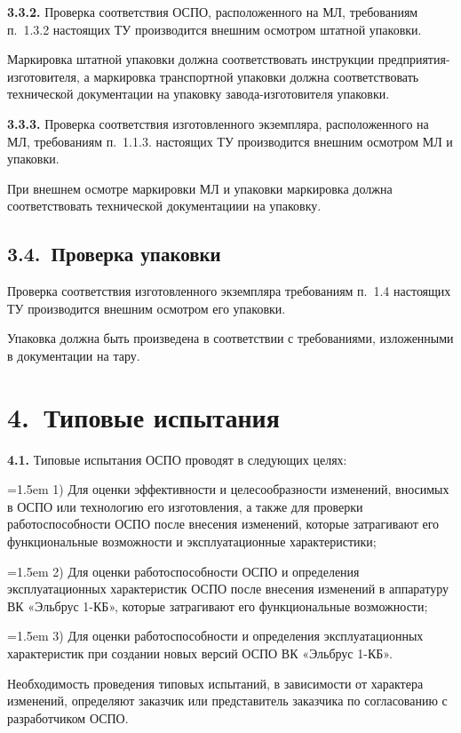\documentclass[11pt,a4paper]{article}
\begin{document}
\par\textbf{3.3.2.} Проверка соответствия ОСПО, расположенного на МЛ, требованиям п.~1.3.2 настоящих ТУ производится внешним осмотром штатной упаковки.\par
Маркировка штатной упаковки должна соответствовать инструкции предприятия-изготовителя, а маркировка транспортной упаковки должна соответствовать технической документации на упаковку завода-изготовителя упаковки.

\par\textbf{3.3.3.} Проверка соответствия изготовленного экземпляра, расположенного на МЛ, требованиям п.~1.1.3. настоящих ТУ производится внешним осмотром МЛ и упаковки.\par
При внешнем осмотре маркировки МЛ и упаковки маркировка должна соответствовать технической документациии на упаковку.

\subsection*{3.4.~Проверка упаковки}
Проверка соответствия изготовленного экземпляра требованиям п.~1.4 настоящих ТУ производится внешним осмотром его упаковки.

Упаковка должна быть произведена в соответствии с требованиями, изложенными в документации на тару.

\section*{4.~Типовые испытания}
\par\textbf{4.1.} Типовые испытания ОСПО проводят в следующих целях:\par
\par\hangindent=1.5em 1) Для оценки эффективности и целесообразности изменений, вносимых в ОСПО или технологию его изготовления, а также для проверки работоспособности ОСПО после внесения изменений, которые затрагивают его функциональные возможности и эксплуатационные характеристики;\par
\par\hangindent=1.5em 2) Для оценки работоспособности ОСПО и определения эксплуатационных характеристик ОСПО после внесения изменений в аппаратуру ВК «Эльбрус 1-КБ», которые затрагивают его функциональные возможности;\par
\par\hangindent=1.5em 3) Для оценки работоспособности и определения эксплуатационных характеристик при создании новых версий ОСПО ВК «Эльбрус 1-КБ».\par
Необходимость проведения типовых испытаний, в зависимости от характера изменений, определяют заказчик или представитель заказчика по согласованию с разработчиком ОСПО.
\end{document}

